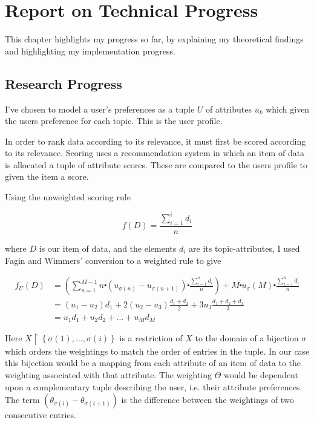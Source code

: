 \chapter{Report on Technical Progress}

This chapter highlights my progress so far, by explaining my theoretical findings and highlighting my implementation progress. 

\section{Research Progress}

I've chosen to model a user's preferences as a tuple $U$ of attributes $u_k$ which given the users preference for each topic. This is the user profile.

In order to rank data according to its relevance, it must first be scored according to its relevance. Scoring uses a recommendation system in which an item of data is allocated a tuple of attribute scores. These are compared to the users profile to given the item a score.

Using the unweighted scoring rule

\begin{equation}\label{AverageUnweightedRule}	
	f(D) = \frac{\sum_{i=1}^{i} d_i}{n}
\end{equation}

where $D$ is our item of data, and the elements $d_i$ are its topic-attributes, I used Fagin and Wimmers' \cite{FaginWimmers1} conversion to a weighted rule to give 

\begin{align}\label{OurWeightedRuleDerivation}
f_U (D) &= \left(\sum_{n=1}^{M-1} n\centerdot (u_{\sigma{(n)}} - u_{\sigma{(n+1)}})\centerdot \frac{\sum_{i=1}^{n} d_i}{n}\right) + M \centerdot u_\sigma{(M)} \centerdot \frac{\sum_{i=1}^{n} d_i}{n} 
\\ &= (u_1-u_2)d_1 + 2(u_2-u_3)\frac{d_1+d_2}{2} + 3u_3\frac{d_1+d_2+d_3}{3}
\\ &= u_1d_1 + u_2d_2 + \dots + u_Md_M
\end{align}

Here $X\upharpoonright\left\{\sigma(1),\dots,\sigma(i)\right\}$ is a restriction of $X$ to the domain of a bijection $\sigma$ which orders the weightings to match the order of entries in the tuple. In our case this bijection would be a mapping from each attribute of an item of data to the weighting associated with that attribute. The weighting $\Theta$ would be dependent upon a complementary tuple describing the user, i.e. their attribute preferences. The term $(\theta_{\sigma{(i)}} - \theta_{\sigma{(i+1)}})$ is the difference between the weightings of two consecutive entries. 

